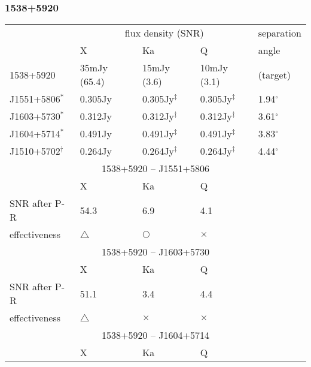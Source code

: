\subsubsection{
  1538+5920
}
\begin{tabular}{p{30mm}|p{30mm}|p{30mm}|p{30mm}|p{20mm}}
\hline
                 & \multicolumn{3}{c|}{flux density (SNR)}
                 & separation \\
\cline{2-4}
                 & X
                 & Ka
                 & Q
                 & angle \\
\hline
1538+5920        &  35mJy (65.4)
                 &  15mJy (3.6)
                 &  10mJy (3.1)
                 & (target)   \\
\hline
J1551+5806$^*$   & 0.305Jy
                 & 0.305Jy$^\ddag$
                 & 0.305Jy$^\ddag$
                 & 1.94$^\circ$ \\
\hline
J1603+5730$^*$   & 0.312Jy
                 & 0.312Jy$^\ddag$
                 & 0.312Jy$^\ddag$
                 & 3.61$^\circ$ \\
\hline
J1604+5714$^*$   & 0.491Jy
                 & 0.491Jy$^\ddag$
                 & 0.491Jy$^\ddag$
                 & 3.83$^\circ$ \\
\hline
J1510+5702$^\dag$& 0.264Jy
                 & 0.264Jy$^\ddag$
                 & 0.264Jy$^\ddag$
                 & 4.44$^\circ$ \\
\hline
\hline
\multicolumn{5}{c}{1538+5920 -- J1551+5806}         \\
\hline
              &  X          & Ka         & \multicolumn{2}{l}{Q}       \\
\hline
SNR after P-R & 54.3        & 6.9        & \multicolumn{2}{l}{4.1}     \\
\hline
effectiveness & $\triangle$ & $\bigcirc$ & \multicolumn{2}{l}{$\times$}\\
\hline
\hline
\multicolumn{5}{c}{1538+5920 -- J1603+5730} \\
\hline
              &  X          & Ka         & \multicolumn{2}{l}{Q}       \\
\hline
SNR after P-R & 51.1        & 3.4        & \multicolumn{2}{l}{4.4}     \\
\hline
effectiveness & $\triangle$ & $\times$   & \multicolumn{2}{l}{$\times$}\\
\hline
\hline
\multicolumn{5}{c}{1538+5920 -- J1604+5714} \\
\hline
              &  X          & Ka         & \multicolumn{2}{l}{Q}       \\

\end{tabular}
